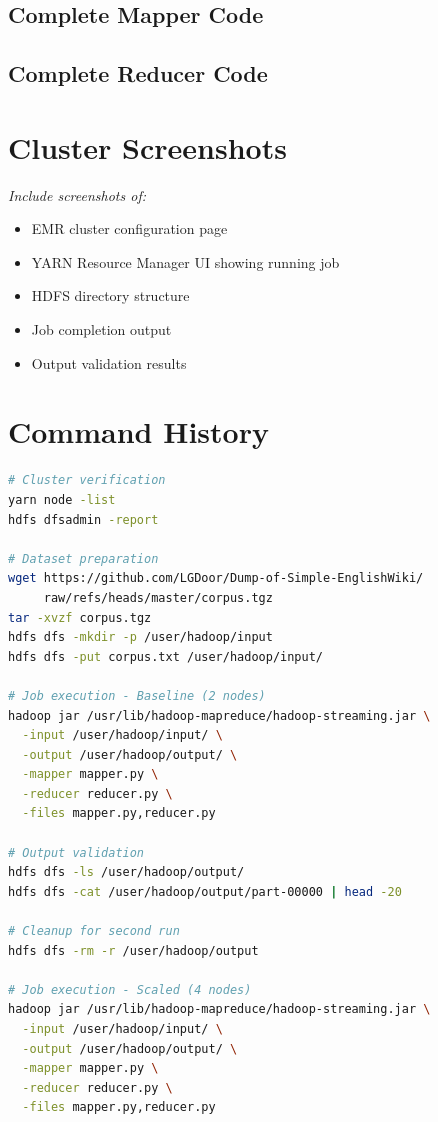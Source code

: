 \documentclass[11pt,a4paper]{article}
\begin{document}
\subsection{Complete Mapper Code}



\subsection{Complete Reducer Code}



\section{Cluster Screenshots}

\textit{Include screenshots of:}
\begin{itemize}
    \item EMR cluster configuration page
    \item YARN Resource Manager UI showing running job
    \item HDFS directory structure
    \item Job completion output
    \item Output validation results
\end{itemize}

\section{Command History}

\begin{lstlisting}[language=bash, caption=Complete Command History]
# Cluster verification
yarn node -list
hdfs dfsadmin -report

# Dataset preparation
wget https://github.com/LGDoor/Dump-of-Simple-EnglishWiki/
     raw/refs/heads/master/corpus.tgz
tar -xvzf corpus.tgz
hdfs dfs -mkdir -p /user/hadoop/input
hdfs dfs -put corpus.txt /user/hadoop/input/

# Job execution - Baseline (2 nodes)
hadoop jar /usr/lib/hadoop-mapreduce/hadoop-streaming.jar \
  -input /user/hadoop/input/ \
  -output /user/hadoop/output/ \
  -mapper mapper.py \
  -reducer reducer.py \
  -files mapper.py,reducer.py

# Output validation
hdfs dfs -ls /user/hadoop/output/
hdfs dfs -cat /user/hadoop/output/part-00000 | head -20

# Cleanup for second run
hdfs dfs -rm -r /user/hadoop/output

# Job execution - Scaled (4 nodes)
hadoop jar /usr/lib/hadoop-mapreduce/hadoop-streaming.jar \
  -input /user/hadoop/input/ \
  -output /user/hadoop/output/ \
  -mapper mapper.py \
  -reducer reducer.py \
  -files mapper.py,reducer.py
\end{lstlisting}
\end{document}
